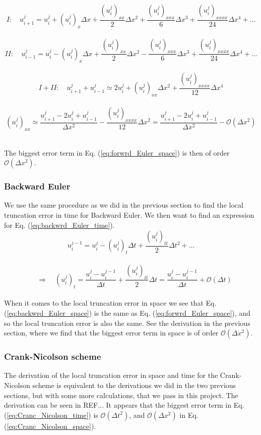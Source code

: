 \documentclass[12pt]{article}
\begin{document}
\begin{flushleft}
\vspace{5mm}
$$I:\quad u_{i+1}^j = u_i^j + (u_i^j)_x\Delta x + \frac{(u_i^j)_{xx}}{2}\Delta x^2 + \frac{(u_i^j)_{xxx}}{6}\Delta x^3 + \frac{(u_i^j)_{xxxx}}{24}\Delta x^4 + \dots$$\\
$$II:\quad u_{i-1}^j = u_i^j - (u_i^j)_x\Delta x + \frac{(u_i^j)_{xx}}{2}\Delta x^2 - \frac{(u_i^j)_{xxx}}{6}\Delta x^3 + \frac{(u_i^j)_{xxxx}}{24}\Delta x^4 + \dots$$\\
$$I+II:\quad u_{i+1}^j + u_{i-1}^j  \simeq 2u_i^j + (u_i^j)_{xx}\Delta x^2 + \frac{(u_i^j)_{xxxx}}{12}\Delta x^4$$\\
$$(u_i^j)_{xx}\simeq \frac{u_{i+1}^j - 2u_i^j + u_{i-1}^j}{\Delta x^2} - \frac{(u_i^j)_{xxxx}}{12}\Delta x^2 = \frac{u_{i+1}^j - 2u_i^j + u_{i-1}^j}{\Delta x^2} - \mathcal{O}(\Delta x^2)$$\\
\vspace{5mm}

The biggest error term in Eq. (\ref{eq:forwrd_Euler_space}) is then of order $\mathcal{O}(\Delta x^2)$.

\subsubsection{Backward Euler}
We use the same procedure as we did in the previous section to find the local truncation error in time for Backward Euler. We then want to find an expression for Eq. (\ref{eq:backwrd_Euler_time}).
\vspace{5mm}
$$u_i^{j-1} = u_i^j - (u_i^j)_t\Delta t + \frac{(u_i^j)_{tt}}{2}\Delta t^2 + \dots$$\\
$$\quad\Rightarrow\quad (u_i^j)_t = \frac{u_i^j - u_i^{j-1}}{\Delta t} + \frac{(u_i^j)_{tt}}{2}\Delta t = \frac{u_i^j - u_i^{j-1}}{\Delta t} + \mathcal{O}(\Delta t)$$\\
\vspace{5mm} 
When it comes to the local truncation error in space we see that Eq. (\ref{eq:backwrd_Euler_space}) is the same as Eq. (\ref{eq:forwrd_Euler_space}), and so the local truncation error is also the same. See the derivation in the previous section, where we find that the biggest error term in space is of order $\mathcal{O}(\Delta x^2)$.

\subsubsection{Crank-Nicolson scheme}
The derivation of the local truncation error in space and time for the Crank-Nicolson scheme is equivalent to the derivations we did in the two previous sections, but with some more calculations, that we pass in this project. The derivation can be seen in REF... It appears that the biggest error term in Eq. (\ref{eq:Cranc_Nicolson_time}) is $\mathcal{O}(\Delta t^2)$, and $\mathcal{O}(\Delta x^2)$ in Eq. (\ref{eq:Cranc_Nicolson_space}).

\end{flushleft}
\end{document}
